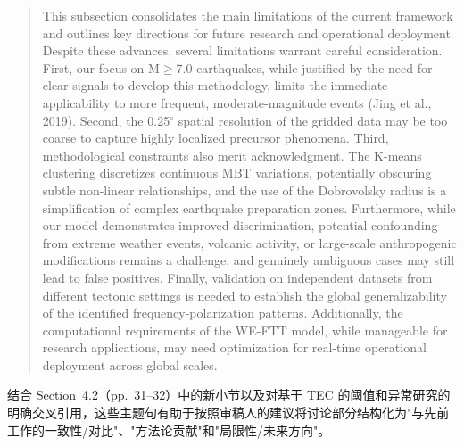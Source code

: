 \documentclass[12pt]{article}
\begin{document}
{\begin{quote}
This subsection consolidates the main limitations of the current framework and outlines key directions for future research and operational deployment. Despite these advances, several limitations warrant careful consideration. First, our focus on M$\ge$7.0 earthquakes, while justified by the need for clear signals to develop this methodology, limits the immediate applicability to more frequent, moderate-magnitude events (Jing et al., 2019). Second, the 0.25$^{\circ}$ spatial resolution of the gridded data may be too coarse to capture highly localized precursor phenomena. Third, methodological constraints also merit acknowledgment. The K-means clustering discretizes continuous MBT variations, potentially obscuring subtle non-linear relationships, and the use of the Dobrovolsky radius is a simplification of complex earthquake preparation zones. Furthermore, while our model demonstrates improved discrimination, potential confounding from extreme weather events, volcanic activity, or large-scale anthropogenic modifications remains a challenge, and genuinely ambiguous cases may still lead to false positives. Finally, validation on independent datasets from different tectonic settings is needed to establish the global generalizability of the identified frequency-polarization patterns. Additionally, the computational requirements of the WE-FTT model, while manageable for research applications, may need optimization for real-time operational deployment across global scales.
\end{quote}

结合 Section~4.2（pp.~31--32）中的新小节以及对基于 TEC 的阈值和异常研究的明确交叉引用，这些主题句有助于按照审稿人的建议将讨论部分结构化为"与先前工作的一致性/对比"、"方法论贡献"和"局限性/未来方向"。
}
\end{document}
